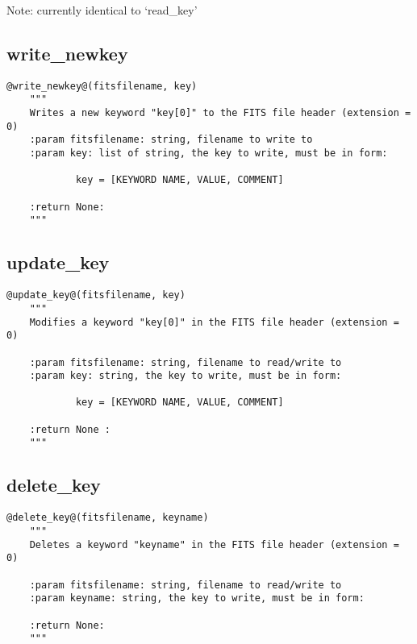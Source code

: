 \noindent Note: currently identical to `read\_key'

\subsection{write\_newkey}
\begin{lstlisting}[style=pythonstyle]
@write_newkey@(fitsfilename, key)
    """
    Writes a new keyword "key[0]" to the FITS file header (extension = 0)
    :param fitsfilename: string, filename to write to
    :param key: list of string, the key to write, must be in form:

            key = [KEYWORD NAME, VALUE, COMMENT]

    :return None:
    """
\end{lstlisting}

\vspace{0.5cm}
\subsection{update\_key}
\begin{lstlisting}[style=pythonstyle]
@update_key@(fitsfilename, key)
    """
    Modifies a keyword "key[0]" in the FITS file header (extension = 0)
    
    :param fitsfilename: string, filename to read/write to
    :param key: string, the key to write, must be in form:

            key = [KEYWORD NAME, VALUE, COMMENT]

    :return None :
    """
\end{lstlisting}

\vspace{0.5cm}
\subsection{delete\_key}
\begin{lstlisting}[style=pythonstyle]
@delete_key@(fitsfilename, keyname)
    """
    Deletes a keyword "keyname" in the FITS file header (extension = 0)

    :param fitsfilename: string, filename to read/write to
    :param keyname: string, the key to write, must be in form:

    :return None:
    """
\end{lstlisting}

\vspace{0.5cm}
